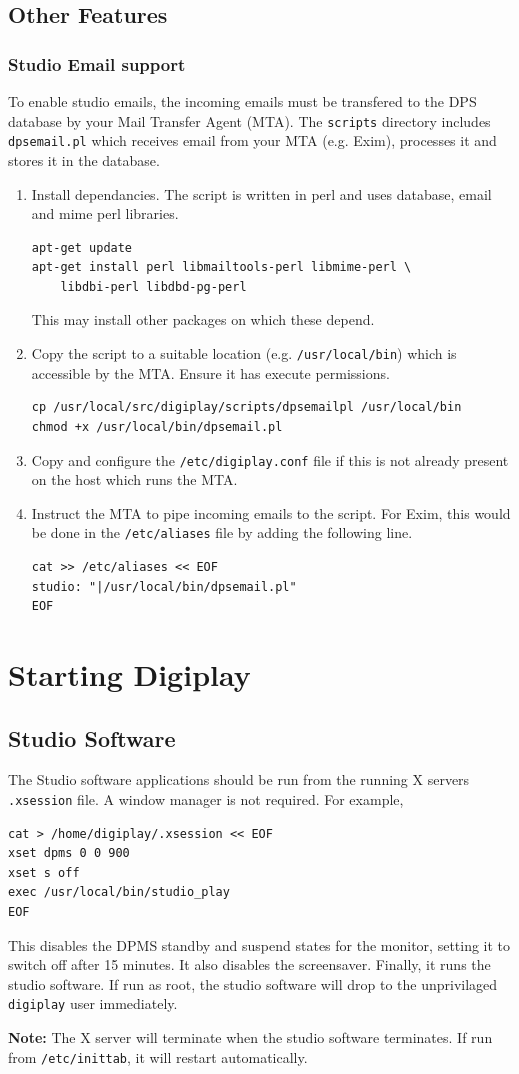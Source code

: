 \documentclass[a4paper,12pt]{report}
\numberwithin{equation}{section}
\begin{document}
\section{Other Features}
\subsection{Studio Email support}
To enable studio emails, the incoming emails must be transfered to the DPS database by your Mail Transfer Agent (MTA). The \texttt{scripts} directory includes \texttt{dpsemail.pl} which receives email from your MTA (e.g. Exim), processes it and stores it in the database.
\begin{enumerate}
\item Install dependancies. The script is written in perl and uses database, email and mime perl libraries.
\begin{lstlisting}
apt-get update
apt-get install perl libmailtools-perl libmime-perl \
    libdbi-perl libdbd-pg-perl
\end{lstlisting}
This may install other packages on which these depend.
\item Copy the script to a suitable location (e.g. \texttt{/usr/local/bin}) which is accessible by the MTA. Ensure it has execute permissions. 
\begin{lstlisting}
cp /usr/local/src/digiplay/scripts/dpsemailpl /usr/local/bin
chmod +x /usr/local/bin/dpsemail.pl
\end{lstlisting}
\item Copy and configure the \texttt{/etc/digiplay.conf} file if this is not already present on the host which runs the MTA.
\item Instruct the MTA to pipe incoming emails to the script. For Exim, this would be done in the \texttt{/etc/aliases} file by adding the following line.
\begin{lstlisting}
cat >> /etc/aliases << EOF
studio: "|/usr/local/bin/dpsemail.pl"
EOF
\end{lstlisting}
\end{enumerate}

\chapter{Starting Digiplay}
\section{Studio Software}
The Studio software applications should be run from the running X servers \texttt{.xsession} file. A window manager is not required. For example,
\begin{lstlisting}
cat > /home/digiplay/.xsession << EOF
xset dpms 0 0 900
xset s off
exec /usr/local/bin/studio_play
EOF
\end{lstlisting}
This disables the DPMS standby and suspend states for the monitor, setting it to switch off after 15 minutes. It also disables the screensaver. Finally, it runs the studio software. If run as root, the studio software will drop to the unprivilaged \texttt{digiplay} user immediately. \par
\textbf{Note:} The X server will terminate when the studio software terminates. If run from \texttt{/etc/inittab}, it will restart automatically.
\end{document}
